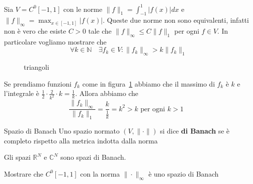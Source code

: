 \begin{example}
    Sia \(V = C^{0}[-1, 1]\) con le norme \(\|f\|_{1} = \int_{-1}^{1} |f(x)|dx\)
    e \(\|f\|_{\infty} = \max_{x \in [-1, 1]} |f(x)|\). Queste due norme non sono
    equivalenti, infatti non è vero che esiste \(C > 0\) tale
    che \(\|f\|_\infty \le C \|f\|_1\) per ogni \(f \in V\).
    In particolare vogliamo mostrare che
    \[
        \forall k \in \mathbb{N} \quad \exists f_k \in V : \|f_k\|_\infty > k
        \|f_k\|_1
    \]
\begin{figure}[ht]
    \centering
    \caption{triangoli}
    \label{fig:triangoli}
\end{figure}
    Se prendiamo funzioni \(f_k\) come in figura~\ref{fig:triangoli} abbiamo che
    il massimo di \(f_k\) è \(k\) e l'integrale è \(\frac{1}{2} \cdot
    \frac{2}{k^2} \cdot k = \frac{1}{k}\). Allora abbiamo che 
    \[
        \frac{\|f_k\|_\infty}{\|f_k\|_1} = \frac{k}{\frac{1}{k}} = k^2 > k
        \text{ per ogni  \(k > 1\) }
    \]
\end{example}

\begin{definition}{Spazio di Banach}
    Uno spazio normato \({(V, \|\cdot \|)}\) si dice \textbf{di Banach} se è
    completo rispetto alla metrica indotta dalla norma
\end{definition}
\begin{example}
    Gli spazi \(\mathbb{R}^{N}\) e \(\mathbb{C}^{N}\) sono spazi di Banach.
\end{example}

\begin{eser}
    Mostrare che \(C^{0}{[-1, 1]}\) con la norma \(\|\cdot \|_\infty\) è
    uno spazio di Banach
\end{eser}

